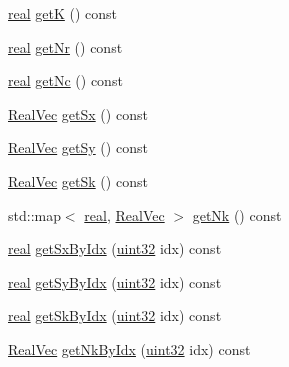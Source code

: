 \begin{DoxyCompactItemize}
\mbox{\hyperlink{typedefs_8cpp_a58a0c7cf2501f4492da833421be92547}{real}} \mbox{\hyperlink{classvd_a624f53ae4a7012f267111359e9245f81}{getK}} () const
\item 
\mbox{\hyperlink{typedefs_8cpp_a58a0c7cf2501f4492da833421be92547}{real}} \mbox{\hyperlink{classvd_a1a1634d6906eb0af4d877c2af3292ca7}{get\+Nr}} () const
\item 
\mbox{\hyperlink{typedefs_8cpp_a58a0c7cf2501f4492da833421be92547}{real}} \mbox{\hyperlink{classvd_ab0de0a5b8929ed7a7bb6ca902a462dd4}{get\+Nc}} () const
\item 
\mbox{\hyperlink{typedefs_8cpp_a84b6d9a0fbb45e01ad4a3aa5667f2992}{Real\+Vec}} \mbox{\hyperlink{classvd_a309203fb398a885176ae985a8906e886}{get\+Sx}} () const
\item 
\mbox{\hyperlink{typedefs_8cpp_a84b6d9a0fbb45e01ad4a3aa5667f2992}{Real\+Vec}} \mbox{\hyperlink{classvd_a704c56db9a9782e1c82d3d199ddfd699}{get\+Sy}} () const
\item 
\mbox{\hyperlink{typedefs_8cpp_a84b6d9a0fbb45e01ad4a3aa5667f2992}{Real\+Vec}} \mbox{\hyperlink{classvd_adf9f15df018d2ceff5f68bdf7bd6f613}{get\+Sk}} () const
\item 
std\+::map$<$ \mbox{\hyperlink{typedefs_8cpp_a58a0c7cf2501f4492da833421be92547}{real}}, \mbox{\hyperlink{typedefs_8cpp_a84b6d9a0fbb45e01ad4a3aa5667f2992}{Real\+Vec}} $>$ \mbox{\hyperlink{classvd_a90613fc46f246a5450e26487caff33f9}{get\+Nk}} () const
\item 
\mbox{\hyperlink{typedefs_8cpp_a58a0c7cf2501f4492da833421be92547}{real}} \mbox{\hyperlink{classvd_a960d4b8fbedb7cbb0686ad42e19d6396}{get\+Sx\+By\+Idx}} (\mbox{\hyperlink{typedefs_8cpp_a8ad23e2333787a214e20a58a284a5a60}{uint32}} idx) const
\item 
\mbox{\hyperlink{typedefs_8cpp_a58a0c7cf2501f4492da833421be92547}{real}} \mbox{\hyperlink{classvd_a0f630fc80e57d3e17ab036f75afde006}{get\+Sy\+By\+Idx}} (\mbox{\hyperlink{typedefs_8cpp_a8ad23e2333787a214e20a58a284a5a60}{uint32}} idx) const
\item 
\mbox{\hyperlink{typedefs_8cpp_a58a0c7cf2501f4492da833421be92547}{real}} \mbox{\hyperlink{classvd_a4d2c835e7804c4242dce6d411f01ce0a}{get\+Sk\+By\+Idx}} (\mbox{\hyperlink{typedefs_8cpp_a8ad23e2333787a214e20a58a284a5a60}{uint32}} idx) const
\item 
\mbox{\hyperlink{typedefs_8cpp_a84b6d9a0fbb45e01ad4a3aa5667f2992}{Real\+Vec}} \mbox{\hyperlink{classvd_a4d058d2d1d675a741a83776c95b2acfb}{get\+Nk\+By\+Idx}} (\mbox{\hyperlink{typedefs_8cpp_a8ad23e2333787a214e20a58a284a5a60}{uint32}} idx) const

\end{DoxyCompactItemize}
